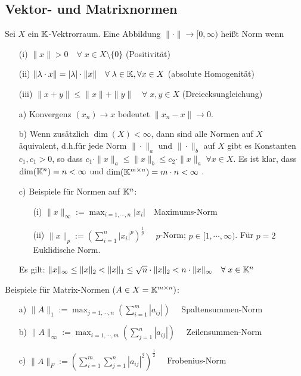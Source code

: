 \subsection{Vektor- und Matrixnormen}
\begin{Definition} [Norm]
  Sei $X$ ein $\mathbb K$-Vektrorraum. Eine Abbildung $\| \cdot \| \rightarrow [0, \infty)$
  heißt Norm wenn
  \begin{enumerate}
    \item[(i)]    $\|x\| > 0 \quad \forall \; x \in X \setminus \lbrace 0 \rbrace$ (Positivität)
    \item[(ii)]   $\| \lambda \cdot x\| = |\lambda| \cdot \|x\| \quad \forall \; \lambda \in \mathbb K, \forall x \in X$ (absolute Homogenität)
    \item[(iii)]  $\|x + y \| \le \|x\| + \|y\| \quad \forall \; x, y \in X$ (Dreiecksungleichung)
  \end{enumerate}
\end{Definition}

\begin{Bemerkungen}
\quad
  \begin{enumerate}
    \item[a)] Konvergenz $(x_n) \rightarrow x$ bedeutet $\|x_n - x\| \rightarrow 0$.
    \item[b)] Wenn zusätzlich $\dim (X) < \infty$, dann sind alle Normen auf $X$
    äquivalent, d.h.für jede Norm $\| \cdot \|_a$ und $\| \cdot \|_b$ auf $X$ gibt
    es Konstanten $c_1, c_1 > 0$, so dass
    $c_1 \cdot \| x \|_a \le \| x \|_b \le c_2 \cdot \| x \|_a \; \forall x \in X$.
    Es ist klar, dass $\dim(\mathbb K^n) = n < \infty$ und
    $\dim(\mathbb K^{m \times n}) = m \cdot n  < \infty$ .
    \item[c)] Beispiele für Normen auf $\mathbb K^n$:
    \begin{enumerate}
      \item[(i)] $\|x\|_\infty := \max_{i = 1, \cdots , n} |x_i| \quad $Maximums-Norm
      \item[(ii)] $\|x\|_p := \left( \sum_{i = 1}^n |x_i|^p \right)^\frac{1}{p} \quad$
      $p$-Norm; $p \in [1, \cdots , \infty)$. Für $p = 2$ Euklidische Norm.
    \end{enumerate}
    Es gilt:
    $\|x\|_\infty \le \|x\|_2 < \|x\|_1 \le \sqrt{n} \cdot \|x\|_2 < n \cdot \|x\|_\infty
    \quad \forall \; x \in \mathbb K^n$
  \end{enumerate}
\end{Bemerkungen}

Beispiele für Matrix-Normen ($A \in X = \mathbb K^{m \times n})$:
\begin{enumerate}
  \item[a)] $\|A\|_1 :=  \max_{j = 1, \cdots , n} \left( \sum_{i = 1}^m |a_{ij}| \right) \quad$ Spaltensummen-Norm
  \item[b)] $\|A\|_\infty :=  \max_{i = 1, \cdots , m} \left( \sum_{j = 1}^n |a_{ij}| \right) \quad$ Zeilensummen-Norm
  \item[c)] $\|A\|_F :=  \left(\sum_{i = 1}^m  \sum_{j = 1}^n |a_{ij}|^2 \right)^{\frac{1}{2}} \quad$
  Frobenius-Norm
\end{enumerate}

